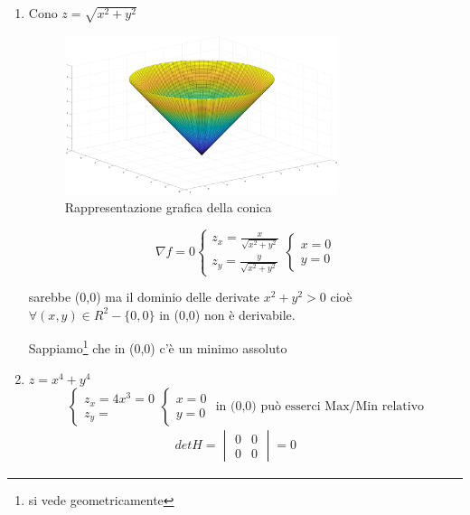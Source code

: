 \begin{esempio}
\begin{enumerate}
	  \item Cono $z=\sqrt{x^2+y^2}$ 
		\begin{figure}[ht]
			\centering
			\includegraphics[width=8cm]{img/finiti/cono.eps}
			\caption{Rappresentazione grafica della conica}
			\label{fig:conica}
		\end{figure}
		\begin{equation*}
			\nabla f=0
			\begin{cases}
				z_x=\frac{x}{\sqrt{x^2+y^2}}\\
				z_y=\frac{y}{\sqrt{x^2+y^2}}
			\end{cases}\begin{cases}
					x=0\\
					y=0
			\end{cases} 
		\end{equation*}
		  \begin{nota}
			  sarebbe (0,0) ma il dominio delle derivate $x^2+y^2>0$ cioè
			  $\forall(x,y)\in R^2-\{0,0\}$ in (0,0) non è derivabile.
		  \end{nota}
		  Sappiamo\footnote{si vede geometricamente} che in (0,0) c'è un
		  {\color{red}minimo assoluto}
	  \item $z=x^4 +y^4$
		  \begin{equation*}
			\begin{cases}
				z_x=4x^3=0\\
				z_y=
			\end{cases}\begin{cases}
					x=0\\
					y=0
			\end{cases} \text{ in (0,0) può esserci Max/Min relativo}
		  \end{equation*}
		  \begin{equation*}
			  \begin{matrix}
				det H=\begin{vmatrix}
					0 & 0\\
					0 & 0
				\end{vmatrix} = 0 & \begin{matrix}

\end{matrix}
\end{matrix}
\end{equation*}
\end{enumerate}
\end{esempio}

